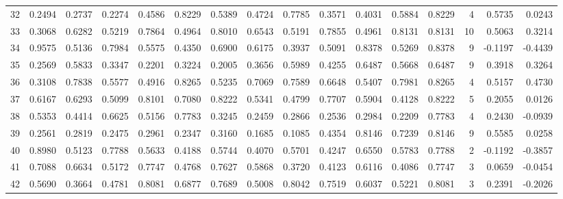 \begin{tabular}{lrrrrrrrrrrrrrrr}
32  &      0.2494 &  0.2737 &  0.2274 &  0.4586 &  0.8229 &  0.5389 &  0.4724 &  0.7785 &  0.3571 &  0.4031 &   0.5884 &     0.8229 &      4 &                    0.5735 &                     0.0243 \\
33  &      0.3068 &  0.6282 &  0.5219 &  0.7864 &  0.4964 &  0.8010 &  0.6543 &  0.5191 &  0.7855 &  0.4961 &   0.8131 &     0.8131 &     10 &                    0.5063 &                     0.3214 \\
34  &      0.9575 &  0.5136 &  0.7984 &  0.5575 &  0.4350 &  0.6900 &  0.6175 &  0.3937 &  0.5091 &  0.8378 &   0.5269 &     0.8378 &      9 &                   -0.1197 &                    -0.4439 \\
35  &      0.2569 &  0.5833 &  0.3347 &  0.2201 &  0.3224 &  0.2005 &  0.3656 &  0.5989 &  0.4255 &  0.6487 &   0.5668 &     0.6487 &      9 &                    0.3918 &                     0.3264 \\
36  &      0.3108 &  0.7838 &  0.5577 &  0.4916 &  0.8265 &  0.5235 &  0.7069 &  0.7589 &  0.6648 &  0.5407 &   0.7981 &     0.8265 &      4 &                    0.5157 &                     0.4730 \\
37  &      0.6167 &  0.6293 &  0.5099 &  0.8101 &  0.7080 &  0.8222 &  0.5341 &  0.4799 &  0.7707 &  0.5904 &   0.4128 &     0.8222 &      5 &                    0.2055 &                     0.0126 \\
38  &      0.5353 &  0.4414 &  0.6625 &  0.5156 &  0.7783 &  0.3245 &  0.2459 &  0.2866 &  0.2536 &  0.2984 &   0.2209 &     0.7783 &      4 &                    0.2430 &                    -0.0939 \\
39  &      0.2561 &  0.2819 &  0.2475 &  0.2961 &  0.2347 &  0.3160 &  0.1685 &  0.1085 &  0.4354 &  0.8146 &   0.7239 &     0.8146 &      9 &                    0.5585 &                     0.0258 \\
40  &      0.8980 &  0.5123 &  0.7788 &  0.5633 &  0.4188 &  0.5744 &  0.4070 &  0.5701 &  0.4247 &  0.6550 &   0.5783 &     0.7788 &      2 &                   -0.1192 &                    -0.3857 \\
41  &      0.7088 &  0.6634 &  0.5172 &  0.7747 &  0.4768 &  0.7627 &  0.5868 &  0.3720 &  0.4123 &  0.6116 &   0.4086 &     0.7747 &      3 &                    0.0659 &                    -0.0454 \\
42  &      0.5690 &  0.3664 &  0.4781 &  0.8081 &  0.6877 &  0.7689 &  0.5008 &  0.8042 &  0.7519 &  0.6037 &   0.5221 &     0.8081 &      3 &                    0.2391 &                    -0.2026 \\

\end{tabular}
